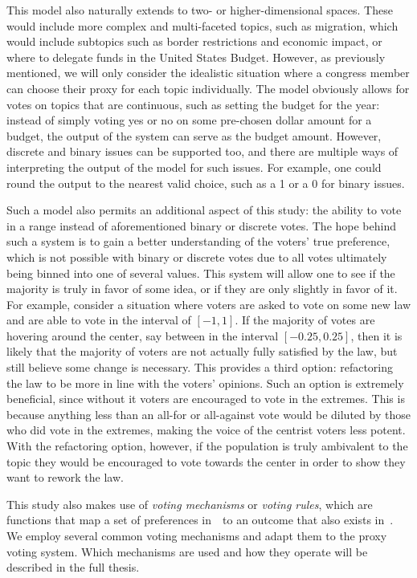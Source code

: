 This model also naturally extends to two- or higher-dimensional spaces.
These would include more complex and multi-faceted topics, such as migration, which
would include subtopics such as border restrictions and economic impact, or where to
delegate funds in the United States Budget.
However, as previously mentioned, we will only consider the idealistic situation
where a congress member can choose their proxy for each topic individually.
The model obviously allows for votes on topics that are continuous, such as setting the
budget for the year: instead of simply voting yes or no on some pre-chosen dollar
amount for a budget, the output of the system can serve as the budget amount.
However, discrete and binary issues can be supported too, and there are multiple
ways of interpreting the output of the model for such issues.
For example, one could round the output to the nearest valid choice, such as a 1 or a
0 for binary issues.

Such a model also permits an additional aspect of this study: the ability to vote in
a range instead of aforementioned binary or discrete votes.
The hope behind such a system is to gain a better understanding of the voters'
true preference, which is not possible with binary or discrete votes due to all votes
ultimately being binned into one of several values.
This system will allow one to see if the majority is truly in favor of some idea, or
if they are only slightly in favor of it.
For example, consider a situation where voters are asked to vote on some new law and
are able to vote in the interval of $[-1, 1]$.
If the majority of votes are hovering around the center, say between in the interval
$[-0.25, 0.25]$, then it is likely that the majority of voters are not actually fully
satisfied by the law, but still believe some change is necessary.
This provides a third option: refactoring the law to be more in line with the
voters' opinions.
Such an option is extremely beneficial, since without it voters are encouraged to
vote in the extremes.
This is because anything less than an all-for or all-against vote would be diluted by
those who did vote in the extremes, making the voice of the centrist voters less potent.
With the refactoring option, however, if the population is truly ambivalent to the
topic they would be encouraged to vote towards the center in order to show they want
to rework the law.

This study also makes use of \textit{voting mechanisms} or \textit{voting rules},
which are functions that map a set of preferences in~\systemspace\ to an outcome that
also exists in~\systemspace.
%
%
We employ several common voting mechanisms and adapt them to the proxy voting system.
Which mechanisms are used and how they operate will be described in the full thesis.

